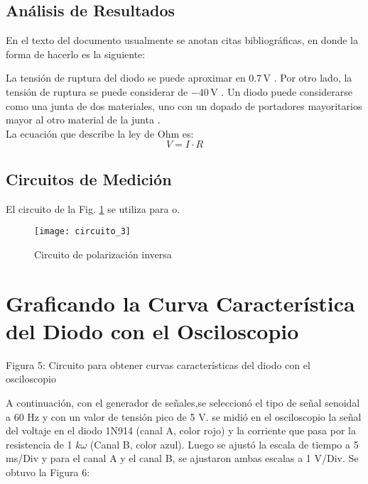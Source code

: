 \documentclass[journal]{IEEEtran}
\begin{document}
\vspace{5mm}

\subsection{Análisis de Resultados}
En el texto del documento usualmente se anotan citas bibliográficas, en donde la forma de hacerlo es la siguiente:


La tensión de ruptura del diodo se puede aproximar en $0.7\,$V \cite{Malik1996,Boylestad,Horowitz1989,Gray1995}. Por otro lado, la tensión de ruptura se puede considerar de $-40\,$V \cite{Floyd2008,Behzad2013,Schilling1994}. Un diodo puede considerarse como una junta de dos materiales, uno con un dopado de portadores mayoritarios mayor al otro material de la junta \cite{Pierret1994}.\\


La ecuación que describe la ley de Ohm es:
\begin{equation}
	V=I\cdot R
\end{equation}

\subsection{Circuitos de Medición}
El circuito de la Fig. \ref{fig_cir2} se utiliza para o.

\begin{figure}[H]
\centering
\texttt{[image: circuito\_3]}
\caption{Circuito de polarización inversa}
\label{fig_cir2}
\end{figure}

\section{Graficando la Curva Característica del Diodo con el Osciloscopio}



Figura 5: Circuito para obtener curvas
características del diodo con el osciloscopio


A continuación, con el generador de señales,se seleccionó el tipo de señal senoidal a 60 Hz y con un valor de tensión pico de 5 V. se midió en el osciloscopio la señal del voltaje en el diodo 1N914 (canal A, color rojo) y la corriente que pasa por la resistencia de 1 $k\omega$ (Canal B, color azul). Luego se ajustó la escala de tiempo a 5 ms/Div y para el canal A y el canal B, se ajustaron ambas escalas a 1 V/Div. Se obtuvo la Figura 6:
\end{document}
